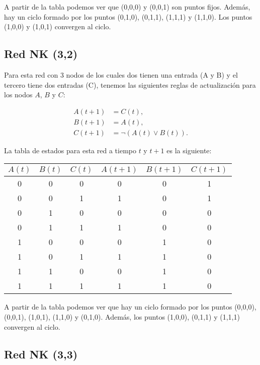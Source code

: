 \documentclass[letterpaper,12pt]{article}
\theoremstyle{plain}
\begin{document}
A partir de la tabla podemos ver que (0,0,0) y (0,0,1) son puntos fijos. Además, hay un ciclo formado por los puntos (0,1,0), (0,1,1), (1,1,1) y (1,1,0). Los puntos (1,0,0) y (1,0,1) convergen al ciclo. 

\subsection{Red NK (3,2)}

Para esta red con 3 nodos de los cuales dos tienen una entrada (A y B) y el tercero tiene dos entradas (C), tenemos las siguientes reglas de actualización para los nodos $A$, $B$ y $C$:

\begin{align}
    A(t+1) &= C(t), \\
    B(t+1) &= A(t), \\
    C(t+1) &= \lnot (A(t) \lor B(t)). 
\end{align}

La tabla de estados para esta red a tiempo $t$ y $t+1$ es la siguiente:

\begin{table}[h]
    \centering
    \begin{tabular}{|c|c|c|c|c|c|}
        \hline
        $A(t)$ & $B(t)$ & $C(t)$ & $A(t+1)$ & $B(t+1)$ & $C(t+1)$ \\
        \hline
        0 & 0 & 0 & 0 & 0 & 1  \\
        0 & 0 & 1 & 1 & 0 & 1  \\
        0 & 1 & 0 & 0 & 0 & 0 \\
        0 & 1 & 1 & 1 & 0 & 0  \\
        1 & 0 & 0 & 0 & 1 & 0  \\
        1 & 0 & 1 & 1 & 1 & 0  \\
        1 & 1 & 0 & 0 & 1 & 0  \\
        1 & 1 & 1 & 1 & 1 & 0  \\
        \hline
\end{tabular}
\end{table}

A partir de la tabla podemos ver que hay un ciclo formado por los puntos (0,0,0), (0,0,1), (1,0,1), (1,1,0) y (0,1,0). Además, los puntos (1,0,0), (0,1,1) y (1,1,1) convergen al ciclo. 

\subsection{Red NK (3,3)}
\end{document}
